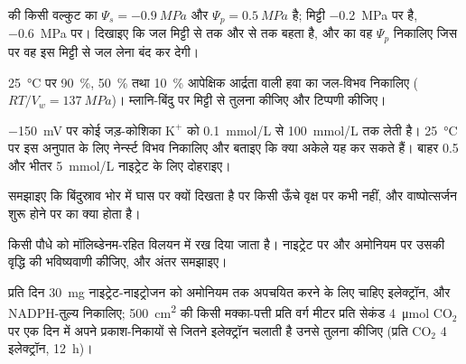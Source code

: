 \begin{exercise}[$\star\star$]\label{exo:b1:plant-water-minerals:5}
 की किसी वल्कुट  का $\Psi_s = \qty{-0.9}{MPa}$ और $\Psi_p =
\qty{0.5}{MPa}$ है; मिट्टी \qty{-0.2}{MPa} पर है,  \qty{-0.6}{MPa}
पर। दिखाइए कि जल मिट्टी से  तक और  से  तक बहता है, और
 का वह $\Psi_p$ निकालिए जिस पर वह इस मिट्टी से जल लेना बंद कर
देगी।
\end{exercise}

\begin{exercise}[$\star\star$]\label{exo:b1:plant-water-minerals:6}
\qty{25}{\celsius} पर \qty{90}{\%}, \qty{50}{\%} तथा \qty{10}{\%}
आपेक्षिक आर्द्रता वाली हवा का जल-विभव निकालिए ($RT/V_w =
\qty{137}{MPa}$)। म्लानि-बिंदु पर मिट्टी से तुलना कीजिए और टिप्पणी
कीजिए।
\end{exercise}

\begin{exercise}[$\star\star$]\label{exo:b1:plant-water-minerals:7}
\qty{-150}{mV} पर कोई जड़-कोशिका $\mathrm{K^+}$ को \qty{0.1}{mmol/L} से
\qty{100}{mmol/L} तक लेती है। \qty{25}{\celsius} पर इस अनुपात के लिए
नेर्न्स्ट विभव निकालिए और बताइए कि क्या अकेले  यह कर सकते हैं।
बाहर \qty{0.5}{} और भीतर \qty{5}{mmol/L} नाइट्रेट के लिए दोहराइए।
\end{exercise}

\begin{exercise}[$\star\star$]\label{exo:b1:plant-water-minerals:8}
समझाइए कि बिंदुस्राव भोर में घास पर क्यों दिखता है पर किसी ऊँचे वृक्ष पर
कभी नहीं, और वाष्पोत्सर्जन शुरू होने पर  का क्या होता है।
\end{exercise}

\begin{exercise}[$\star\star$]\label{exo:b1:plant-water-minerals:9}
किसी पौधे को मॉलिब्डेनम-रहित विलयन में रख दिया जाता है। नाइट्रेट पर और
अमोनियम पर उसकी वृद्धि की भविष्यवाणी कीजिए, और अंतर समझाइए।
\end{exercise}

\begin{exercise}[$\star\star\star$]\label{exo:b1:plant-water-minerals:10}
प्रति दिन \qty{30}{mg} नाइट्रेट-नाइट्रोजन को अमोनियम तक अपचयित करने के
लिए चाहिए इलेक्ट्रॉन, और NADPH-तुल्य निकालिए; \qty{500}{cm^2} की किसी
मक्का-पत्ती प्रति वर्ग मीटर प्रति सेकंड \qty{4}{\micro mol}
$\mathrm{CO_2}$ पर एक दिन में अपने प्रकाश-निकायों से जितने इलेक्ट्रॉन
चलाती है उनसे तुलना कीजिए (प्रति $\mathrm{CO_2}$ 4 इलेक्ट्रॉन, \qty{12}{h})।
\end{exercise}

